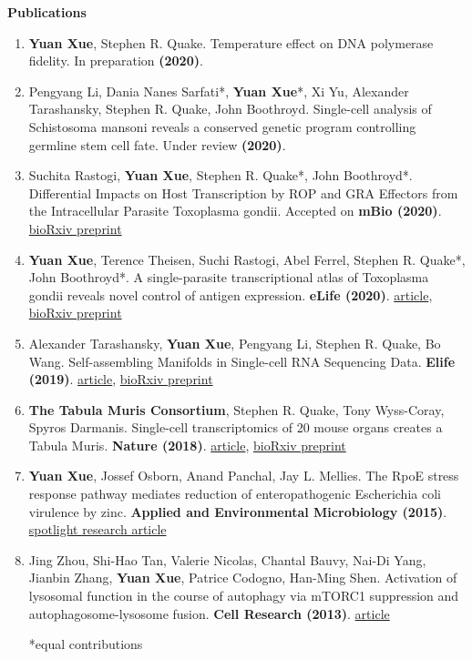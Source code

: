 \documentclass[letterpaper,12pt]{article}[leftmargin=*]
\renewcommand{\section}[2]{\vspace{5pt}
  \colorbox{secondary}{\color{white}\raggedbottom\normalsize\textbf{{#1}{\hspace{7pt}#2}}}
}
\begin{document}
\section{\faBook}{Publications}

\begin{enumerate}
    \item \textbf{Yuan Xue}, Stephen R. Quake. Temperature effect on DNA polymerase fidelity. In preparation \textbf{(2020)}.
    \item Pengyang Li, Dania Nanes Sarfati*, \textbf{Yuan Xue}*, Xi Yu, Alexander Tarashansky, Stephen R. Quake, John Boothroyd. Single-cell analysis of Schistosoma mansoni reveals a conserved genetic program controlling germline stem cell fate. Under review \textbf{(2020)}.
    \item Suchita Rastogi, \textbf{Yuan Xue}, Stephen R. Quake*, John Boothroyd*. Differential Impacts on Host Transcription by ROP and GRA Effectors from the Intracellular Parasite Toxoplasma gondii. Accepted on \textbf{mBio (2020)}. \href{https://www.biorxiv.org/content/10.1101/2020.02.04.934570v2.abstract}{bioRxiv preprint}
    \item \textbf{Yuan Xue}, Terence Theisen, Suchi Rastogi, Abel Ferrel, Stephen R. Quake*, John Boothroyd*. A single-parasite transcriptional atlas of Toxoplasma gondii reveals novel control of antigen expression. \textbf{eLife (2020)}. \href{https://elifesciences.org/articles/54129}{article}, \href{https://www.biorxiv.org/content/10.1101/656165v2}{bioRxiv preprint}
    \item Alexander Tarashansky, \textbf{Yuan Xue}, Pengyang Li, Stephen R. Quake, Bo Wang. Self-assembling Manifolds in Single-cell RNA Sequencing Data. \textbf{Elife (2019)}. \href{https://elifesciences.org/articles/48994}{article}, \href{https://www.biorxiv.org/content/10.1101/364166v2}{bioRxiv preprint}
    \item \textbf{The Tabula Muris Consortium}, Stephen R. Quake, Tony Wyss-Coray, Spyros Darmanis. Single-cell transcriptomics of 20 mouse organs creates a Tabula Muris. \textbf{Nature (2018)}. \href{https://www.nature.com/articles/s41586-018-0590-4}{article}, \href{https://www.biorxiv.org/content/10.1101/237446v2}{bioRxiv preprint}
    \item \textbf{Yuan Xue}, Jossef Osborn, Anand Panchal, Jay L. Mellies. The RpoE stress response pathway mediates reduction of enteropathogenic Escherichia coli virulence by zinc. \textbf{Applied and Environmental Microbiology (2015)}. \href{https://aem.asm.org/content/81/11/3766.short}{spotlight research article}
    \item  Jing Zhou, Shi-Hao Tan, Valerie Nicolas, Chantal Bauvy, Nai-Di Yang, Jianbin Zhang, \textbf{Yuan Xue}, Patrice Codogno, Han-Ming Shen. Activation of lysosomal function in the course of autophagy via mTORC1 suppression and autophagosome-lysosome fusion. \textbf{Cell Research (2013)}. \href{https://www.ncbi.nlm.nih.gov/pmc/articles/PMC3616426/}{article}

        *equal contributions
\end{enumerate}
\end{document}
